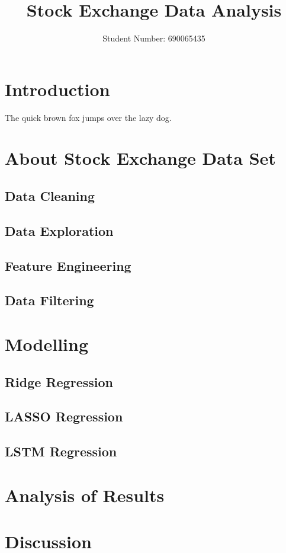 \documentclass[a4paper, 11pt]{article}
\begin{document}
\title{Stock Exchange Data Analysis}
\author{Student Number: 690065435}
\maketitle

\section{Introduction}
The quick brown fox jumps over the lazy dog.

\section{About Stock Exchange Data Set}

\subsection{Data Cleaning}

\subsection{Data Exploration}

\subsection{Feature Engineering}

\subsection{Data Filtering}

\section{Modelling}

\subsection{Ridge Regression}

\subsection{LASSO Regression}

\subsection{LSTM Regression}

\section{Analysis of Results}

\section{Discussion}
\end{document}
